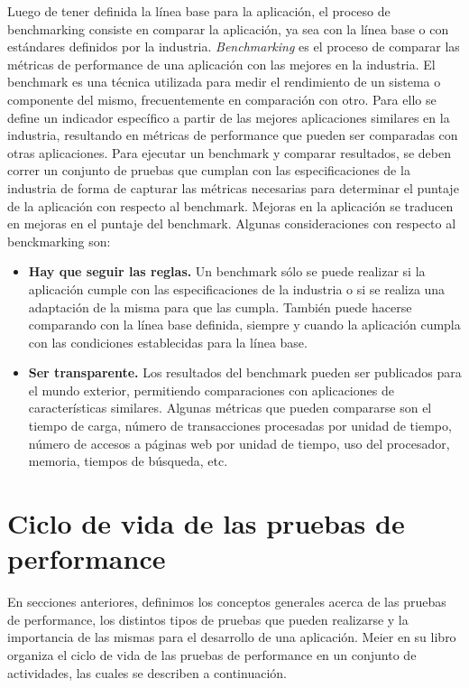 Luego de tener definida la línea base para la aplicación, el proceso de benchmarking consiste en comparar la aplicación, ya sea con la línea base o con estándares definidos por la industria. \emph{Benchmarking} es el proceso de comparar las métricas de performance de una aplicación con las mejores en la industria. El benchmark es una técnica utilizada para medir el rendimiento de un sistema o componente del mismo, frecuentemente en comparación con otro. Para ello se define un indicador específico a partir de las mejores aplicaciones similares en la industria, resultando en métricas de performance que pueden ser comparadas con otras aplicaciones.
Para ejecutar un benchmark y comparar resultados, se deben correr un conjunto de pruebas que cumplan con las especificaciones de la industria de forma de capturar las métricas necesarias para determinar el puntaje de la aplicación con respecto al benchmark. Mejoras en la aplicación se traducen en mejoras en el puntaje del benchmark. Algunas consideraciones con respecto al benckmarking son:
\begin{itemize}
	\item
	\textbf{Hay que seguir las reglas.} Un benchmark sólo se puede realizar si la aplicación cumple con las especificaciones de la industria o si se realiza una adaptación de la misma
	para que las cumpla. También puede hacerse comparando con la línea base definida, siempre y cuando la aplicación cumpla con las condiciones establecidas para la línea base.
	\item
	\textbf{Ser transparente.} Los resultados del benchmark pueden ser publicados para el mundo exterior, permitiendo comparaciones con aplicaciones de características similares.
	Algunas métricas que pueden compararse son el tiempo de carga, número de transacciones procesadas por unidad de tiempo, número de accesos a páginas web por
	unidad de tiempo, uso del procesador, memoria, tiempos de búsqueda, etc.
\end{itemize}


\section{Ciclo de vida de las pruebas de performance}
\label{capitulo2:actividades}

En secciones anteriores, definimos los conceptos generales acerca de las pruebas de performance, los distintos tipos de pruebas que pueden realizarse y la importancia de las mismas para el desarrollo de una aplicación. Meier en su libro \cite{Meier:2007:PTG:1461439} organiza el ciclo de vida de las pruebas de performance en un conjunto de actividades, las cuales se describen a continuación.


